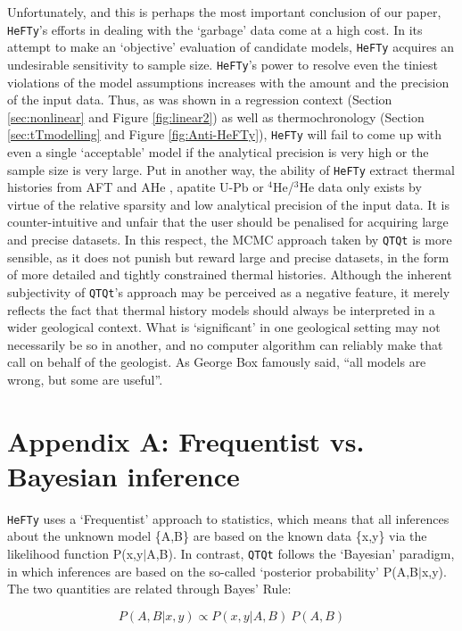 \documentclass{article}
\begin{document}
Unfortunately, and this is perhaps the most important conclusion of
our paper, {\tt HeFTy}'s efforts in dealing with the `garbage' data
come at a high cost.  In its attempt to make an `objective' evaluation
of candidate models, {\tt HeFTy} acquires an undesirable sensitivity
to sample size.  {\tt HeFTy}'s power to resolve even the tiniest
violations of the model assumptions increases with the amount and the
precision of the input data.  Thus, as was shown in a regression
context (Section \ref{sec:nonlinear} and Figure \ref{fig:linear2}) as
well as thermochronology (Section \ref{sec:tTmodelling} and Figure
\ref{fig:Anti-HeFTy}), {\tt HeFTy} will fail to come up with even a
single `acceptable' model if the analytical precision is very high or
the sample size is very large.  Put in another way, the ability of
{\tt HeFTy} extract thermal histories from AFT and AHe
\cite{tian2014}, apatite U-Pb \cite{cochrane2014} or $^4$He/$^3$He
data \cite{karlstrom2014} only exists by virtue of the relative
sparsity and low analytical precision of the input data. It is
counter-intuitive and unfair that the user should be penalised for
acquiring large and precise datasets. In this respect, the MCMC
approach taken by {\tt QTQt} is more sensible, as it does not punish
but reward large and precise datasets, in the form of more detailed
and tightly constrained thermal histories.  Although the inherent
subjectivity of {\tt QTQt}'s approach may be perceived as a negative
feature, it merely reflects the fact that thermal history models
should always be interpreted in a wider geological context.  What is
`significant' in one geological setting may not necessarily be so in
another, and no computer algorithm can reliably make that call on
behalf of the geologist. As George Box famously said, ``all models are
wrong, but some are useful''.

\section*{Appendix A: Frequentist vs. Bayesian inference}

{\tt HeFTy} uses a `Frequentist' approach to statistics, which means
that all inferences about the unknown model \{A,B\} are based on the
known data \{x,y\} via the likelihood function P(x,y$|$A,B). In
contrast, {\tt QTQt} follows the `Bayesian' paradigm, in which
inferences are based on the so-called `posterior probability'
P(A,B$|$x,y). The two quantities are related through Bayes' Rule:

\begin{equation}
P(A,B|x,y) \propto P(x,y|A,B) ~ P(A,B)
\label{eq:bayesrule}
\end{equation}
\end{document}
